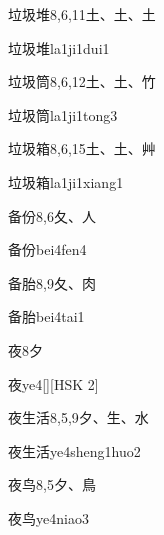 \begin{entry}{垃圾堆}{8,6,11}{⼟、⼟、⼟}
  \begin{phonetics}{垃圾堆}{la1ji1dui1}
  \end{phonetics}
\end{entry}

\begin{entry}{垃圾筒}{8,6,12}{⼟、⼟、⽵}
  \begin{phonetics}{垃圾筒}{la1ji1tong3}
  \end{phonetics}
\end{entry}

\begin{entry}{垃圾箱}{8,6,15}{⼟、⼟、⾋}
  \begin{phonetics}{垃圾箱}{la1ji1xiang1}
  \end{phonetics}
\end{entry}

\begin{entry}{备份}{8,6}{⼡、⼈}
  \begin{phonetics}{备份}{bei4fen4}
  \end{phonetics}
\end{entry}

\begin{entry}{备胎}{8,9}{⼡、⾁}
  \begin{phonetics}{备胎}{bei4tai1}
  \end{phonetics}
\end{entry}

\begin{entry}{夜}{8}{⼣}
  \begin{phonetics}{夜}{ye4}[][HSK 2]
  \end{phonetics}
\end{entry}

\begin{entry}{夜生活}{8,5,9}{⼣、⽣、⽔}
  \begin{phonetics}{夜生活}{ye4sheng1huo2}
  \end{phonetics}
\end{entry}

\begin{entry}{夜鸟}{8,5}{⼣、⿃}
  \begin{phonetics}{夜鸟}{ye4niao3}
  \end{phonetics}
\end{entry}

